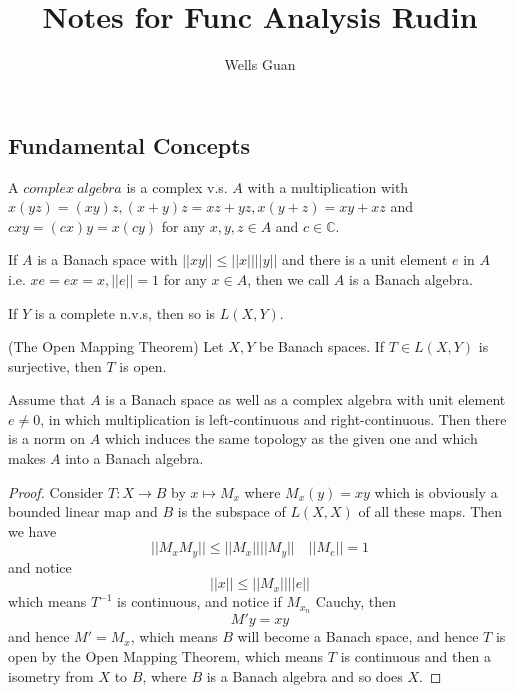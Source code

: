 \documentclass[lang=en, color=blue, ]{elegantbook}
\title{Notes for Func Analysis Rudin}
\author{Wells Guan}
\newcommand{\C}{\mathbb{C}}
\begin{document}


\chapter{}

\section*{Fundamental Concepts}

\begin{definition}
A $complex\ algebra$ is a complex v.s. $A$ with a multiplication with $x(yz) = (xy)z, (x+y)z = xz+yz, x(y+z) = xy+xz$ and $cxy = (cx)y = x(cy)$ for any $x,y,z\in A$ and $c\in \C$.\par
If $A$ is a Banach space with $||xy|| \leq ||x||||y||$ and there is a unit element $e$ in $A$ i.e. $xe = ex = x, ||e||=1$ for any $x\in A$, then we call $A$ is a Banach algebra.
\end{definition}

\begin{lemma}
    If $Y$ is a complete n.v.s, then so is $L(X,Y)$.
\end{lemma}

\begin{lemma}
    (The Open Mapping Theorem) Let $X,Y$ be Banach spaces. If $T\in L(X,Y)$ is surjective, then $T$ is open.
\end{lemma}

\begin{theorem}
    Assume that $A$ is a Banach space as well as a complex algebra with unit element $e \neq 0$, in which multiplication is left-continuous and right-continuous. Then there is a norm on $A$ which induces the same topology as the given one and which makes $A$ into a Banach algebra.
\end{theorem}
\begin{proof}\par
    Consider $T: X\to B$ by $x\mapsto M_x$ where $M_x(y) = xy$ which is obviously a bounded linear map and $B$ is the subspace of $L(X,X)$ of all these maps. Then we have
    \[||M_xM_y|| \leq  ||M_x||||M_y||\quad ||M_e|| = 1\]
    and notice
    \[||x|| \leq ||M_x||||e||\]
    which means $T^{-1}$ is continuous, and notice if $M_{x_n}$ Cauchy, then
    \[M' y = xy\]
    and hence $M' = M_x$, which means $B$ will become a Banach space, and hence $T$ is open by the Open Mapping Theorem, which means $T$ is continuous and then a isometry from $X$ to $B$, where $B$ is a Banach algebra and so does $X$.
\end{proof}
\end{document}
